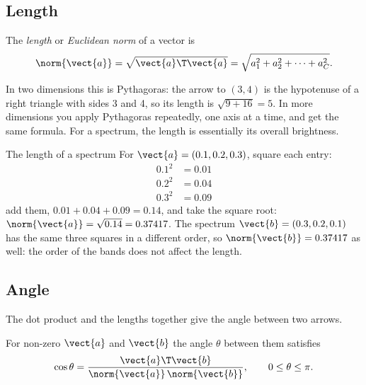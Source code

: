 \subsection{Length}

\begin{definition}[Norm]
The \emph{length} or \emph{Euclidean norm} of a vector is
\begin{equation}\label{eq:linalg:norm}
\norm{\vect{a}} = \sqrt{\vect{a}\T\vect{a}} = \sqrt{a_1^2 + a_2^2 + \cdots + a_C^2}.
\end{equation}
\end{definition}

In two dimensions this is Pythagoras: the arrow to $(3, 4)$ is the hypotenuse of a right
triangle with sides 3 and 4, so its length is $\sqrt{9 + 16} = 5$. In more dimensions you apply
Pythagoras repeatedly, one axis at a time, and get the same formula. For a spectrum, the length
is essentially its overall brightness.

\begin{worked}[label={we:linalg:norm}]{The length of a spectrum}
For $\vect{a} = (0.1, 0.2, 0.3)$, square each entry:
\begin{align*}
0.1^2 &= 0.01\\
0.2^2 &= 0.04\\
0.3^2 &= 0.09
\end{align*}
add them, $0.01 + 0.04 + 0.09 = 0.14$, and take the square root:
$\norm{\vect{a}} = \sqrt{0.14} = 0.37417$.
The spectrum $\vect{b} = (0.3, 0.2, 0.1)$ has the same three squares in a different order, so
$\norm{\vect{b}} = 0.37417$ as well: the order of the bands does not affect the length.
\end{worked}

\subsection{Angle}

The dot product and the lengths together give the angle between two arrows.

\begin{definition}
For non-zero $\vect{a}$ and $\vect{b}$ the angle $\theta$ between them satisfies
\begin{equation}\label{eq:linalg:cos}
\cos\theta = \frac{\vect{a}\T\vect{b}}{\norm{\vect{a}}\,\norm{\vect{b}}},
\qquad 0 \le \theta \le \pi .
\end{equation}
\end{definition}

